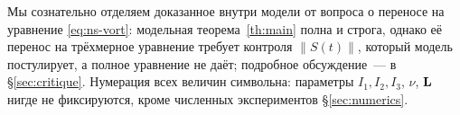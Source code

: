Мы сознательно отделяем доказанное внутри модели от вопроса о переносе
на уравнение \eqref{eq:ns-vort}: модельная теорема~\ref{th:main} полна и
строга, однако её перенос на трёхмерное уравнение требует контроля
$\|S(t)\|$, который модель постулирует, а полное уравнение не даёт;
подробное обсуждение~--- в \S\ref{sec:critique}. Нумерация всех величин
символьна: параметры $I_1, I_2, I_3$, $\nu$, $\mathbf{L}$ нигде не фиксируются,
кроме численных экспериментов \S\ref{sec:numerics}.
